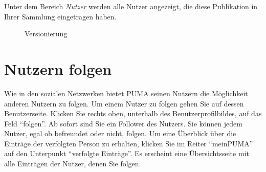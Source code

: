 Unter dem Bereich \textit{Nutzer} werden alle Nutzer angezeigt, die diese Publikation in Ihrer Sammlung eingetragen haben.
\begin{figure}[h!]
 \centering
 \caption{Versionierung}
 \label{fig:versionierung}
\end{figure}
\section{Nutzern folgen}
\label{sec:nutzernFolgen}
Wie in den sozialen Netzwerken bietet PUMA seinen Nutzern die Möglichkeit anderen Nutzern zu folgen. \newline
Um einem Nutzer zu folgen gehen Sie auf dessen Benutzerseite. Klicken Sie rechts oben, unterhalb des Benutzerprofilbildes, auf das Feld \enquote{folgen}. Ab sofort sind Sie ein Follower des Nutzers. Sie können jedem Nutzer, egal ob befreundet oder nicht, folgen. \newline \newline
Um eine Überblick über die Einträge der verfolgten Person zu erhalten, klicken Sie im Reiter \enquote{meinPUMA} auf den Unterpunkt \enquote{verfolgte Einträge}. Es erscheint eine Übersichtsseite mit alle Einträgen der Nutzer, denen Sie folgen. 





